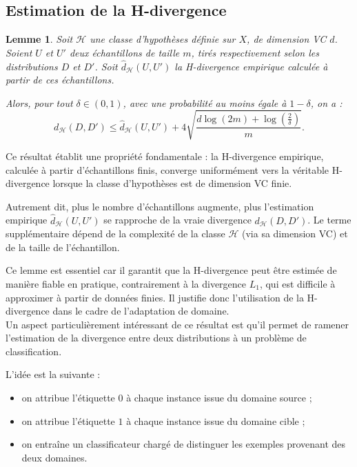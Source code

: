 \documentclass[a4paper,12pt]{article}
\newtheorem{lemma}{Lemme}[section]
\theoremstyle{definition}
\theoremstyle{remark}
\begin{document}

\subsection{Estimation de la H-divergence}

\begin{lemma}
Soit $\mathcal{H}$ une classe d’hypothèses définie sur $X$, de dimension VC $d$. Soient $U$ et $U'$ deux échantillons de taille $m$, tirés respectivement selon les distributions $D$ et $D'$. Soit $\hat{d}_{\mathcal{H}}(U, U')$ la H-divergence empirique calculée à partir de ces échantillons.

Alors, pour tout $\delta \in (0,1)$, avec une probabilité au moins égale à $1 - \delta$, on a :
\[
d_{\mathcal{H}}(D, D') \leq \hat{d}_{\mathcal{H}}(U, U') + 4 \sqrt{\frac{d \log(2m) + \log\left(\frac{2}{\delta}\right)}{m}}.
\]
\end{lemma}




Ce résultat établit une propriété fondamentale : la H-divergence empirique, calculée à partir d’échantillons finis, converge uniformément vers la véritable H-divergence lorsque la classe d’hypothèses est de dimension VC finie.

Autrement dit, plus le nombre d’échantillons augmente, plus l’estimation empirique $\hat{d}_{\mathcal{H}}(U, U')$ se rapproche de la vraie divergence $d_{\mathcal{H}}(D, D')$. Le terme supplémentaire dépend de la complexité de la classe $\mathcal{H}$ (via sa dimension VC) et de la taille de l’échantillon.

Ce lemme est essentiel car il garantit que la H-divergence peut être estimée de manière fiable en pratique, contrairement à la divergence $L_1$, qui est difficile à approximer à partir de données finies. Il justifie donc l’utilisation de la H-divergence dans le cadre de l’adaptation de domaine.\\



Un aspect particulièrement intéressant de ce résultat est qu’il permet de ramener l’estimation de la divergence entre deux distributions à un problème de classification.

L’idée est la suivante :
\begin{itemize}
\item on attribue l’étiquette $0$ à chaque instance issue du domaine source ;
\item on attribue l’étiquette $1$ à chaque instance issue du domaine cible ;
\item on entraîne un classificateur chargé de distinguer les exemples provenant des deux domaines.
\end{itemize}
\end{document}
